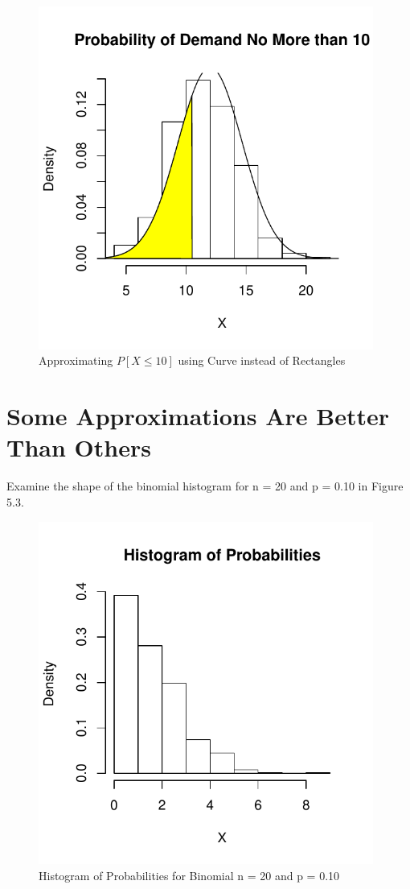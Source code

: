 \documentclass[11pt, chapterprefix=true]{scrbook}\usepackage[]{graphicx}\usepackage[]{color}
\begin{document}
\begin{figure}[ht]
\caption{Approximating $P[X \le 10]$ using Curve instead of Rectangles}



{\centering \includegraphics[width=11cm]{figure/LBL5c-1} 

}




\end{figure}

\section{Some Approximations Are Better Than Others}

Examine the shape of the binomial histogram for n = 20 and p = 0.10 in Figure 5.3.

\begin{figure}[ht]
\caption{Histogram of Probabilities for Binomial n = 20 and p = 0.10}


{\centering \includegraphics[width=11cm]{figure/LBL5d-1} 

}



\end{figure}
\end{document}
